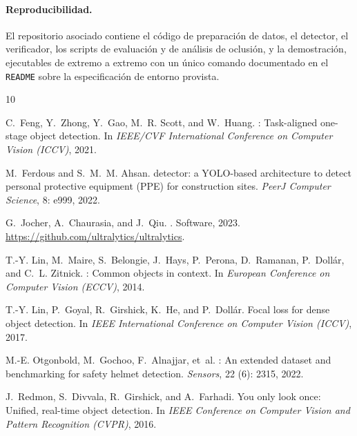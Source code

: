 \documentclass{article}
\begin{document}
\paragraph{Reproducibilidad.} El repositorio asociado contiene el código de
preparación de datos, el detector, el verificador, los scripts de evaluación y
de análisis de oclusión, y la demostración, ejecutables de extremo a extremo
con un único comando documentado en el \texttt{README} sobre la especificación
de entorno provista.

\small

\begin{thebibliography}{10}
\providecommand{\natexlab}[1]{#1}

C.~Feng, Y.~Zhong, Y.~Gao, M.~R. Scott, and W.~Huang.
: Task-aligned one-stage object detection.
\newblock In \emph{IEEE/CVF International Conference on Computer Vision (ICCV)},
  2021.

M.~Ferdous and S.~M.~M. Ahsan.
 detector: a {YOLO}-based architecture to detect personal
  protective equipment ({PPE}) for construction sites.
\newblock \emph{PeerJ Computer Science}, 8: e999, 2022.

G.~Jocher, A.~Chaurasia, and J.~Qiu.
.
\newblock Software, 2023.
\newblock \url{https://github.com/ultralytics/ultralytics}.

T.-Y. Lin, M.~Maire, S.~Belongie, J.~Hays, P.~Perona, D.~Ramanan, P.~Doll\'ar,
  and C.~L. Zitnick.
: Common objects in context.
\newblock In \emph{European Conference on Computer Vision (ECCV)}, 2014.

T.-Y. Lin, P.~Goyal, R.~Girshick, K.~He, and P.~Doll\'ar.
\newblock Focal loss for dense object detection.
\newblock In \emph{IEEE International Conference on Computer Vision (ICCV)},
  2017.

M.-E. Otgonbold, M.~Gochoo, F.~Alnajjar, et~al.
: An extended dataset and benchmarking for safety helmet
  detection.
\newblock \emph{Sensors}, 22 (6): 2315, 2022.

J.~Redmon, S.~Divvala, R.~Girshick, and A.~Farhadi.
\newblock You only look once: Unified, real-time object detection.
\newblock In \emph{IEEE Conference on Computer Vision and Pattern Recognition
  (CVPR)}, 2016.


\end{thebibliography}
\end{document}
